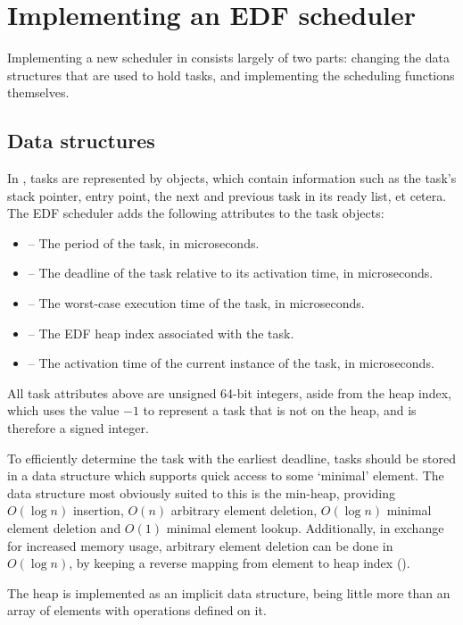 \chapter{Implementing an EDF scheduler}
Implementing a new scheduler in \ucosiii consists largely of two parts: changing the data structures that are used to hold tasks, and implementing the scheduling functions themselves.

\section{Data structures}
In \ucosiii, tasks are represented by  objects, which contain information such as the task's stack pointer, entry point, the next and previous task in its ready list, et cetera. The EDF scheduler adds the following attributes to the task objects:

\begin{itemize}
    \item {} -- The period of the task, in microseconds.
    \item {} -- The deadline of the task relative to its activation time, in microseconds.
    \item {} -- The worst-case execution time of the task, in microseconds.
    \item {} -- The EDF heap index associated with the task.
    \item {} -- The activation time of the current instance of the task, in microseconds.
\end{itemize}

\noindent All task attributes above are unsigned 64-bit integers, aside from the heap index, which uses the value $-1$ to represent a task that is not on the heap, and is therefore a signed integer.

To efficiently determine the task with the earliest deadline, tasks should be stored in a data structure which supports quick access to some `minimal' element. The data structure most obviously suited to this is the min-heap, providing $O(\log n)$ insertion, $O(n)$ arbitrary element deletion, $O(\log n)$ minimal element deletion and $O(1)$ minimal element lookup. Additionally, in exchange for increased memory usage, arbitrary element deletion can be done in $O(\log n)$, by keeping a reverse mapping from element to heap index ().

The heap is implemented as an implicit data structure, being little more than an array of  elements with operations defined on it.

